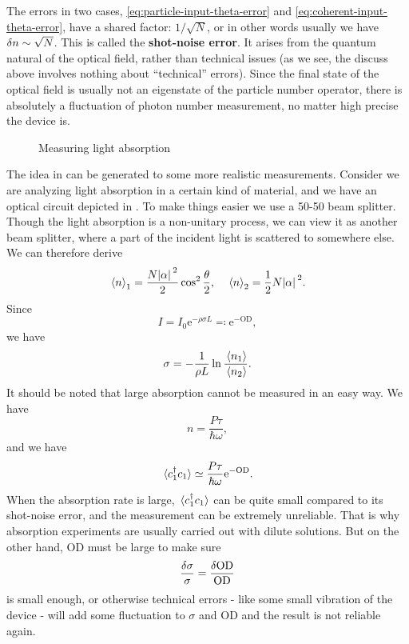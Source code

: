 \documentclass[hyperref, a4paper]{article}
\newcommand*{\ee}{\mathrm{e}}
\newcommand*{\concept}[1]{{\textbf{#1}}}
\begin{document}
The errors in two cases, \eqref{eq:particle-input-theta-error} and \eqref{eq:coherent-input-theta-error}, have a shared factor: $1 / \sqrt{N}$, or in other words usually we have $\var{n} \sim \sqrt{N}$.
This is called the \concept{shot-noise error}. It arises from the quantum natural of the optical field, rather than technical issues (as we see, the discuss above involves nothing about ``technical'' errors).
Since the final state of the optical field is usually not an eigenstate of the particle number operator, there is absolutely a fluctuation of photon number measurement, no matter high precise the device is.

\begin{figure}
    \centering
    
    \caption{Measuring light absorption}
    \label{fig:absorption-measure}
\end{figure}

The idea in  can be generated to some more realistic measurements.
Consider we are analyzing light absorption in a certain kind of material, and we have an optical circuit depicted in .
To make things easier we use a 50-50 beam splitter.
Though the light absorption is a non-unitary process, we can view it as another beam splitter, where a part of the incident light is scattered to somewhere else.
We can therefore derive 
\begin{equation}
    \expval*{n}_1 = \frac{N \abs*{\alpha}^2}{2} \cos^2 \frac{\theta}{2}, \quad \expval*{n}_2 = \frac{1}{2} N \abs*{\alpha}^2.
\end{equation}
Since 
\begin{equation}
    I = I_0 \ee^{- \rho \sigma L} \eqqcolon \ee^{- \mathrm{OD}},
\end{equation}
we have 
\begin{equation}
    \sigma = - \frac{1}{\rho L} \ln \frac{\expval*{n_1}}{\expval*{n_2}}.
\end{equation}
It should be noted that large absorption cannot be measured in an easy way.
We have 
\[
    n = \frac{P \tau}{\hbar \omega},
\]
and we have 
\begin{equation}
    \expval*{c^\dagger_1 c_1} \simeq \frac{P \tau}{\hbar \omega} \ee^{- \text{OD}}.
\end{equation}
When the absorption rate is large, $\expval*{c_1^\dagger c_1}$ can be quite small compared to its shot-noise error, and the measurement can be extremely unreliable.
That is why absorption experiments are usually carried out with dilute solutions.
But on the other hand, $\text{OD}$ must be large to make sure 
\begin{equation}
    \frac{\var{\sigma}}{\sigma} = \frac{\var{\text{OD}}}{\text{OD}}
\end{equation}
is small enough, or otherwise technical errors - like some small vibration of the device - will add some fluctuation to $\sigma$ and OD and the result is not reliable again.
\end{document}
